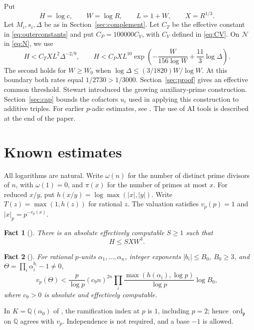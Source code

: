\documentclass{amsart}
\newtheorem{fact}{Fact}
\theoremstyle{remark}
\newcommand{\Q}{\mathbb Q}
\numberwithin{equation}{section}
\begin{document}
Put
\begin{equation}\label{eq:notation}
H=\log c,\qquad W=\log R,\qquad L=1+W,\qquad X=R^{1/3}.
\end{equation}
Let $M_i,s_i,\Delta$ be as in Section~\ref{sec:complement}.
Let $C_T$ be the effective constant in \eqref{eq:outerconstants} and put
$C_P=100000C_V$, with $C_V$ defined in \eqref{eq:CV}.
On $\mathcal N$ in \eqref{eq:N}, we use
\begin{equation}\label{eq:skeleton}
H<C_T XL^2\Delta^{-2/9},\qquad
H<C_P XL^{10}\exp\!\left(-\frac{W}{156\log W}
                         +\frac{11}3\log\Delta\right).
\end{equation}
The second holds for $W\ge W_0$ when $\log\Delta\le(3/1820)W/\log W$.
At this boundary both rates equal $1/2730>1/3000$.
Section~\ref{sec:proof} gives an effective common threshold.
Stewart \cite[Section~4, (4.13)--(4.14)]{Stewart2013} introduced the
growing auxiliary-prime construction.
Section~\ref{sec:cap} bounds the cofactors $u_i$ used in applying this
construction to additive triples.
For earlier $p$-adic estimates, see \cite{Yu2007}.
The use of AI tools is described at the end of the paper.

\section{Known estimates}\label{sec:inputs}
All logarithms are natural.
Write $\omega(n)$ for the number of distinct prime divisors of $n$,
with $\omega(1)=0$, and $\pi(x)$ for the number of primes at most $x$.
For reduced $x/y$, put $h(x/y)=\log\max(|x|,|y|)$.
Write $T(z)=\max(1,h(z))$ for rational $z$.
The valuation satisfies $v_p(p)=1$ and $|x|_p=p^{-v_p(x)}$.

\begin{fact}[{\cite[Theorem~1, p.~170, (5)]{SY2001}}]\label{fact:global}
There is an absolute effectively computable $S\ge1$ such that
\begin{equation}\label{eq:global}
H\le S XW^3.
\end{equation}
\end{fact}

\begin{fact}[{\cite[Lemma~2, p.~173, and (10), p.~172]{SY2001}}]\label{fact:local}
For rational $p$-units $\alpha_1,\ldots,\alpha_n$, integer exponents
$|b_i|\le B_0$, $B_0\ge3$, and $\Theta=\prod_i\alpha_i^{b_i}-1\ne0$,
\begin{equation}\label{eq:local}
v_p(\Theta)<\frac p{\log p}(c_9n)^{2n}
 \prod_i\frac{\max(h(\alpha_i),\log p)}{\log p}\log B_0,
\end{equation}
where $c_9>0$ is absolute and effectively computable.
\end{fact}
In $K=\Q(\alpha_0)$ of \cite[Section~2, (10)]{SY2001}, the ramification
index at $p$ is $1$, including $p=2$; hence $\operatorname{ord}_{\mathfrak p}$
on $\Q$ agrees with $v_p$.
Independence is not required, and a base $-1$ is allowed.
\end{document}
